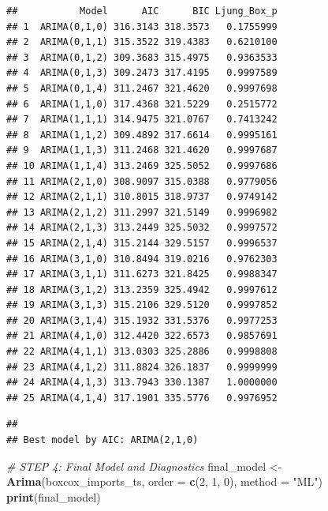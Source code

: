 \documentclass[
]{article}
\newenvironment{Shaded}{\begin{snugshade}}{\end{snugshade}}
\newcommand{\AttributeTok}[1]{\textcolor[rgb]{0.13,0.29,0.53}{#1}}
\newcommand{\CommentTok}[1]{\textcolor[rgb]{0.56,0.35,0.01}{\textit{#1}}}
\newcommand{\DecValTok}[1]{\textcolor[rgb]{0.00,0.00,0.81}{#1}}
\newcommand{\FunctionTok}[1]{\textcolor[rgb]{0.13,0.29,0.53}{\textbf{#1}}}
\newcommand{\NormalTok}[1]{#1}
\newcommand{\OtherTok}[1]{\textcolor[rgb]{0.56,0.35,0.01}{#1}}
\newcommand{\SpecialCharTok}[1]{\textcolor[rgb]{0.81,0.36,0.00}{\textbf{#1}}}
\newcommand{\StringTok}[1]{\textcolor[rgb]{0.31,0.60,0.02}{#1}}
\begin{document}
\begin{verbatim}
##           Model      AIC      BIC Ljung_Box_p
## 1  ARIMA(0,1,0) 316.3143 318.3573   0.1755999
## 2  ARIMA(0,1,1) 315.3522 319.4383   0.6210100
## 3  ARIMA(0,1,2) 309.3683 315.4975   0.9363533
## 4  ARIMA(0,1,3) 309.2473 317.4195   0.9997589
## 5  ARIMA(0,1,4) 311.2467 321.4620   0.9997698
## 6  ARIMA(1,1,0) 317.4368 321.5229   0.2515772
## 7  ARIMA(1,1,1) 314.9475 321.0767   0.7413242
## 8  ARIMA(1,1,2) 309.4892 317.6614   0.9995161
## 9  ARIMA(1,1,3) 311.2468 321.4620   0.9997687
## 10 ARIMA(1,1,4) 313.2469 325.5052   0.9997686
## 11 ARIMA(2,1,0) 308.9097 315.0388   0.9779056
## 12 ARIMA(2,1,1) 310.8015 318.9737   0.9749142
## 13 ARIMA(2,1,2) 311.2997 321.5149   0.9996982
## 14 ARIMA(2,1,3) 313.2449 325.5032   0.9997572
## 15 ARIMA(2,1,4) 315.2144 329.5157   0.9996537
## 16 ARIMA(3,1,0) 310.8494 319.0216   0.9762303
## 17 ARIMA(3,1,1) 311.6273 321.8425   0.9988347
## 18 ARIMA(3,1,2) 313.2359 325.4942   0.9997612
## 19 ARIMA(3,1,3) 315.2106 329.5120   0.9997852
## 20 ARIMA(3,1,4) 315.1932 331.5376   0.9977253
## 21 ARIMA(4,1,0) 312.4420 322.6573   0.9857691
## 22 ARIMA(4,1,1) 313.0303 325.2886   0.9998808
## 23 ARIMA(4,1,2) 311.8824 326.1837   0.9999999
## 24 ARIMA(4,1,3) 313.7943 330.1387   1.0000000
## 25 ARIMA(4,1,4) 317.1901 335.5776   0.9976952
\end{verbatim}

\begin{Shaded}
\end{Shaded}

\begin{verbatim}
## 
## Best model by AIC: ARIMA(2,1,0)
\end{verbatim}

\begin{Shaded}
\begin{Highlighting}[]
\CommentTok{\# STEP 4: Final Model and Diagnostics}
\NormalTok{final\_model }\OtherTok{\textless{}{-}} \FunctionTok{Arima}\NormalTok{(boxcox\_imports\_ts, }\AttributeTok{order =} \FunctionTok{c}\NormalTok{(}\DecValTok{2}\NormalTok{, }\DecValTok{1}\NormalTok{, }\DecValTok{0}\NormalTok{), }\AttributeTok{method =} \StringTok{"ML"}\NormalTok{)}
\FunctionTok{print}\NormalTok{(final\_model)}
\end{Highlighting}
\end{Shaded}
\end{document}

